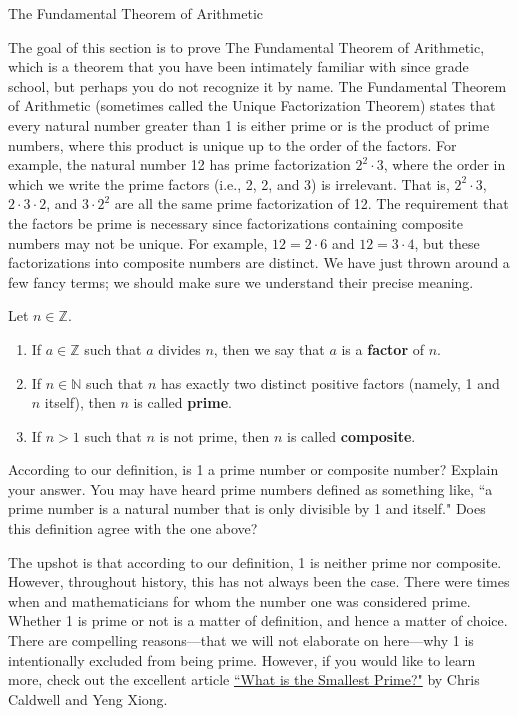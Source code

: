 \begin{section}{The Fundamental Theorem of Arithmetic}

The goal of this section is to prove The Fundamental Theorem of Arithmetic, which is a theorem that you have been intimately familiar with since grade school, but perhaps you do not recognize it by name.  The Fundamental Theorem of Arithmetic (sometimes called the Unique Factorization Theorem) states that every natural number greater than 1 is either prime or is the product of prime numbers, where this product is unique up to the order of the factors. For example, the natural number 12 has prime factorization $2^2\cdot 3$, where the order in which we write the prime factors (i.e., 2, 2, and 3) is irrelevant. That is, $2^2\cdot 3$, $2\cdot 3\cdot2$, and $3\cdot 2^2$ are all the same prime factorization of 12. The requirement that the factors be prime is necessary since factorizations containing composite numbers may not be unique. For example, $12=2\cdot 6$ and $12=3\cdot 4$, but these factorizations into composite numbers are distinct. We have just thrown around a few fancy terms; we should make sure we understand their precise meaning.

\begin{definition}
Let $n\in\mathbb{Z}$.
\begin{enumerate}[label=\textrm{(\alph*)}]
\item If $a\in \mathbb{Z}$ such that $a$ divides $n$, then we say that $a$ is a \textbf{factor} of $n$.
\item If $n\in \mathbb{N}$ such that $n$ has exactly two distinct positive factors (namely, 1 and $n$ itself), then $n$ is called \textbf{prime}.
\item If $n>1$ such that $n$ is not prime, then $n$ is called \textbf{composite}.
\end{enumerate}
\end{definition}

\begin{problem}
According to our definition, is 1 a prime number or composite number?  Explain your answer. You may have heard prime numbers defined as something like, ``a prime number is a natural number that is only divisible by 1 and itself."  Does this definition agree with the one above?
\end{problem}

The upshot is that according to our definition, 1 is neither prime nor composite.  However, throughout history, this has not always been the case.  There were times when and mathematicians for whom the number one was considered prime.  Whether 1 is prime or not is a matter of definition, and hence a matter of choice.  There are compelling reasons---that we will not elaborate on here---why 1 is intentionally excluded from being prime.  However, if you would like to learn more, check out the excellent article \href{https://cs.uwaterloo.ca/journals/JIS/VOL15/Caldwell1/cald5.pdf}{``What is the Smallest Prime?"} by Chris Caldwell and Yeng Xiong.


\end{section}
